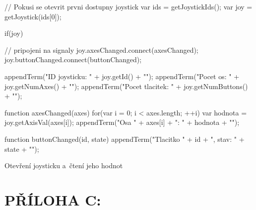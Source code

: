 \documentclass[12pt, a4paper, oneside]{article}
\begin{document}
\begin{listing}[H]
\begin{jscode}
// Pokusi se otevrit prvni dostupny joystick
var ids = getJoystickIds();
var joy = getJoystick(ids[0]);

if(joy) {
    // pripojeni na signaly
    joy.axesChanged.connect(axesChanged);
    joy.buttonChanged.connect(buttonChanged);

    appendTerm("ID joysticku: " + joy.getId() + "\n");
    appendTerm("Pocet os: " + joy.getNumAxes() + "\n");
    appendTerm("Pocet tlacitek: " +
            joy.getNumButtons() + "\n");
}

function axesChanged(axes) {
    for(var i = 0; i < axes.length; ++i) {
        var hodnota = joy.getAxisVal(axes[i]);
        appendTerm("Osa " + axes[i] + ": " + hodnota + "\n");
    }
}

function buttonChanged(id, state) {
    appendTerm("Tlacitko " + id + ", stav: " + state + "\n");
}
\end{jscode}
\caption{Otevření joysticku a~čtení jeho hodnot}
\end{listing}

\newpage
\section*{PŘÍLOHA C:}
\end{document}
